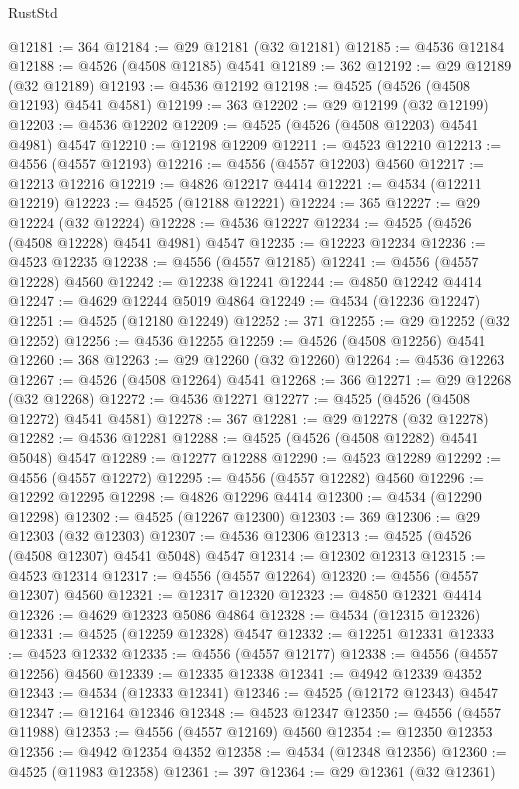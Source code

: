 \begin{lexlean}{RustStd}
\begin{coremodule}
@12181 := 364
@12184 := @29 @12181 (@32 @12181)
@12185 := @4536 @12184
@12188 := @4526 (@4508 @12185) @4541
@12189 := 362
@12192 := @29 @12189 (@32 @12189)
@12193 := @4536 @12192
@12198 := @4525 (@4526 (@4508 @12193) @4541 @4581)
@12199 := 363
@12202 := @29 @12199 (@32 @12199)
@12203 := @4536 @12202
@12209 := @4525 (@4526 (@4508 @12203) @4541 @4981) @4547
@12210 := @12198 @12209
@12211 := @4523 @12210
@12213 := @4556 (@4557 @12193)
@12216 := @4556 (@4557 @12203) @4560
@12217 := @12213 @12216
@12219 := @4826 @12217 @4414
@12221 := @4534 (@12211 @12219)
@12223 := @4525 (@12188 @12221)
@12224 := 365
@12227 := @29 @12224 (@32 @12224)
@12228 := @4536 @12227
@12234 := @4525 (@4526 (@4508 @12228) @4541 @4981) @4547
@12235 := @12223 @12234
@12236 := @4523 @12235
@12238 := @4556 (@4557 @12185)
@12241 := @4556 (@4557 @12228) @4560
@12242 := @12238 @12241
@12244 := @4850 @12242 @4414
@12247 := @4629 @12244 @5019 @4864
@12249 := @4534 (@12236 @12247)
@12251 := @4525 (@12180 @12249)
@12252 := 371
@12255 := @29 @12252 (@32 @12252)
@12256 := @4536 @12255
@12259 := @4526 (@4508 @12256) @4541
@12260 := 368
@12263 := @29 @12260 (@32 @12260)
@12264 := @4536 @12263
@12267 := @4526 (@4508 @12264) @4541
@12268 := 366
@12271 := @29 @12268 (@32 @12268)
@12272 := @4536 @12271
@12277 := @4525 (@4526 (@4508 @12272) @4541 @4581)
@12278 := 367
@12281 := @29 @12278 (@32 @12278)
@12282 := @4536 @12281
@12288 := @4525 (@4526 (@4508 @12282) @4541 @5048) @4547
@12289 := @12277 @12288
@12290 := @4523 @12289
@12292 := @4556 (@4557 @12272)
@12295 := @4556 (@4557 @12282) @4560
@12296 := @12292 @12295
@12298 := @4826 @12296 @4414
@12300 := @4534 (@12290 @12298)
@12302 := @4525 (@12267 @12300)
@12303 := 369
@12306 := @29 @12303 (@32 @12303)
@12307 := @4536 @12306
@12313 := @4525 (@4526 (@4508 @12307) @4541 @5048) @4547
@12314 := @12302 @12313
@12315 := @4523 @12314
@12317 := @4556 (@4557 @12264)
@12320 := @4556 (@4557 @12307) @4560
@12321 := @12317 @12320
@12323 := @4850 @12321 @4414
@12326 := @4629 @12323 @5086 @4864
@12328 := @4534 (@12315 @12326)
@12331 := @4525 (@12259 @12328) @4547
@12332 := @12251 @12331
@12333 := @4523 @12332
@12335 := @4556 (@4557 @12177)
@12338 := @4556 (@4557 @12256) @4560
@12339 := @12335 @12338
@12341 := @4942 @12339 @4352
@12343 := @4534 (@12333 @12341)
@12346 := @4525 (@12172 @12343) @4547
@12347 := @12164 @12346
@12348 := @4523 @12347
@12350 := @4556 (@4557 @11988)
@12353 := @4556 (@4557 @12169) @4560
@12354 := @12350 @12353
@12356 := @4942 @12354 @4352
@12358 := @4534 (@12348 @12356)
@12360 := @4525 (@11983 @12358)
@12361 := 397
@12364 := @29 @12361 (@32 @12361)

\end{coremodule}
\end{lexlean}
